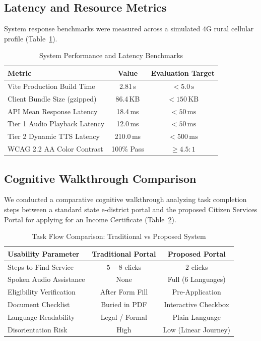 \documentclass[conference]{IEEEtran}
\begin{document}
\subsection{Latency and Resource Metrics}
System response benchmarks were measured across a simulated $4\text{G}$ rural cellular profile (Table~\ref{tab:performance}).

\begin{table}[htbp]
\caption{System Performance and Latency Benchmarks}
\label{tab:performance}
\centering
\begin{tabularx}{\columnwidth}{Xcc}
\toprule
\textbf{Metric} & \textbf{Value} & \textbf{Evaluation Target} \\
\midrule
Vite Production Build Time & 2.81\,s & $< 5.0\,\text{s}$ \\
Client Bundle Size (gzipped) & 86.4\,KB & $< 150\,\text{KB}$ \\
API Mean Response Latency & 18.4\,ms & $< 50\,\text{ms}$ \\
Tier 1 Audio Playback Latency & 12.0\,ms & $< 50\,\text{ms}$ \\
Tier 2 Dynamic TTS Latency & 210.0\,ms & $< 500\,\text{ms}$ \\
WCAG 2.2 AA Color Contrast & 100\% Pass & $\ge 4.5:1$ \\
\bottomrule
\end{tabularx}
\end{table}

\subsection{Cognitive Walkthrough Comparison}
We conducted a comparative cognitive walkthrough analyzing task completion steps between a standard state e-district portal and the proposed Citizen Services Portal for applying for an Income Certificate (Table~\ref{tab:comparison}).

\begin{table}[htbp]
\caption{Task Flow Comparison: Traditional vs Proposed System}
\label{tab:comparison}
\centering
\begin{tabularx}{\columnwidth}{p{3.5cm}cc}
\toprule
\textbf{Usability Parameter} & \textbf{Traditional Portal} & \textbf{Proposed Portal} \\
\midrule
Steps to Find Service & $5 - 8$ clicks & $2$ clicks \\
Spoken Audio Assistance & None & Full (6 Languages) \\
Eligibility Verification & After Form Fill & Pre-Application \\
Document Checklist & Buried in PDF & Interactive Checkbox \\
Language Readability & Legal / Formal & Plain Language \\
Disorientation Risk & High & Low (Linear Journey) \\
\bottomrule
\end{tabularx}
\end{table}
\end{document}
